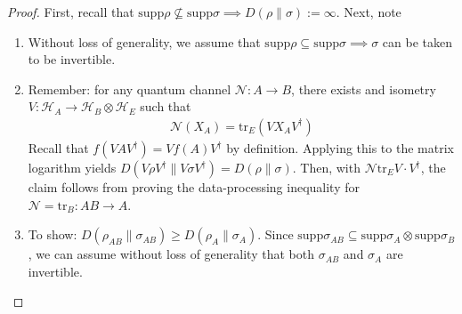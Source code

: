 \documentclass[notoc]{tufte-book}
\begin{document}
\begin{proof}
First, recall that $\text{supp}\rho \nsubseteq \text{supp}\sigma \implies D(\rho \| \sigma) := \infty.$ Next, note
\begin{enumerate}
    \item Without loss of generality, we assume that $\text{supp}\rho \subseteq \text{supp}\sigma \implies \sigma$ can be taken to be invertible.
    \item Remember: for any quantum channel $\mathcal{N}:A\rightarrow B$, there exists and isometry $V: \mathcal{H}_A \rightarrow \mathcal{H}_B \otimes \mathcal{H}_E$ such that 
    \begin{align}
        \mathcal{N}(X_A) = \text{tr}_E(VX_A V^{\dagger})
    \end{align}
Recall that $f(V A V^{\dagger}) = V f(A) V^{\dagger}$ by definition. Applying this to the matrix logarithm yields $D(V\rho V^{\dagger} \| V \sigma V^{\dagger})=D(\rho \| \sigma)$. Then, with $\mathcal{N} \text{tr}_E V \cdot V^{\dagger}$, the claim follows from proving the data-processing inequality for $\mathcal{N}=\text{tr}_B: AB \rightarrow A$.

\item To show: $D(\rho_{AB} \| \sigma_{AB}) \geq D(\rho_{A}\| \sigma_A)$. Since $\text{supp} \sigma_{AB} \subseteq \text{supp}\sigma_A \otimes \text{supp}\sigma_B $, we can assume without loss of generality that both $\sigma_{AB}$ and $\sigma_A$ are invertible. 
\end{enumerate}


\end{proof}
\end{document}
